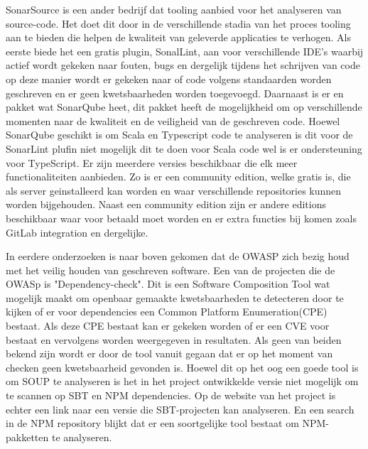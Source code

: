 SonarSource is een ander bedrijf dat tooling aanbied voor het analyseren van source-code. Het doet dit door in de verschillende stadia van het proces tooling aan te bieden die helpen de kwaliteit van geleverde applicaties te verhogen. Als eerste biede het een gratis plugin, SonalLint, aan voor verschillende IDE's waarbij actief wordt gekeken naar fouten, bugs en dergelijk tijdens het schrijven van code op deze manier wordt er gekeken naar of code volgens standaarden worden geschreven en er geen kwetsbaarheden worden toegevoegd. Daarnaast is er en pakket wat SonarQube heet, dit pakket heeft de mogelijkheid om op verschillende momenten naar de kwaliteit en de veiligheid van de geschreven code. Hoewel SonarQube geschikt is om Scala en Typescript code te analyseren is dit voor de SonarLint plufin niet mogelijk dit te doen voor Scala code wel is er ondersteuning voor TypeScript. Er zijn meerdere versies beschikbaar die elk meer functionaliteiten aanbieden. Zo is er een community edition, welke gratis is, die als server geinstalleerd kan worden en waar verschillende repositories kunnen worden bijgehouden. Naast een community edition zijn er andere editions beschikbaar waar voor betaald moet worden en er extra functies bij komen zoals GitLab integration en dergelijke.

In eerdere onderzoeken is naar boven gekomen dat de OWASP zich bezig houd met het veilig houden van geschreven software. Een van de projecten die de OWASp is "Dependency-check". Dit is een Software Composition Tool wat mogelijk maakt om openbaar gemaakte kwetsbaarheden te detecteren door te kijken of er voor dependencies een Common Platform Enumeration(CPE) bestaat. Als deze CPE bestaat kan er gekeken worden of er een CVE voor bestaat en vervolgens worden weergegeven in resultaten. Als geen van beiden bekend zijn wordt er door de tool vanuit gegaan dat er op het moment van checken geen kwetsbaarheid gevonden is. Hoewel dit op het oog een goede tool is om SOUP te analyseren is het in het project ontwikkelde versie niet mogelijk om te scannen op SBT en NPM dependencies. Op de website van het project is echter een link naar een versie die SBT-projecten kan analyseren. En een search in de NPM repository blijkt dat er een soortgelijke tool bestaat om NPM-pakketten te analyseren.


%
%

